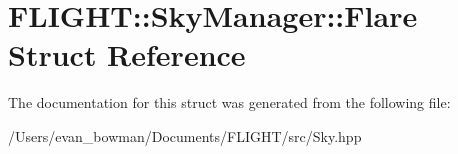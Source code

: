 \hypertarget{struct_f_l_i_g_h_t_1_1_sky_manager_1_1_flare}{}\section{F\+L\+I\+G\+HT\+:\+:Sky\+Manager\+:\+:Flare Struct Reference}
\label{struct_f_l_i_g_h_t_1_1_sky_manager_1_1_flare}


The documentation for this struct was generated from the following file\+:\begin{DoxyCompactItemize}
\item 
/\+Users/evan\+\_\+bowman/\+Documents/\+F\+L\+I\+G\+H\+T/src/Sky.\+hpp\end{DoxyCompactItemize}
